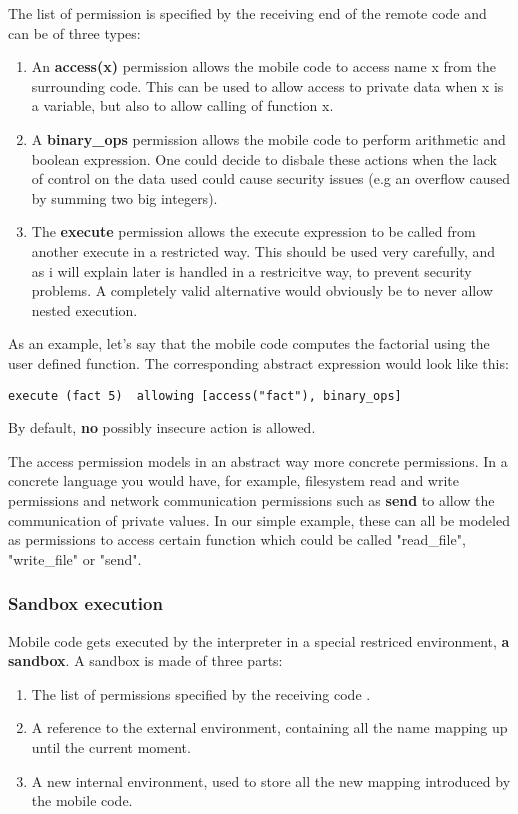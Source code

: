 \documentclass{article}
\begin{document}
The list of permission is specified by the receiving end of the remote code and can be of three types: 
\begin{enumerate}
    \item An \textbf{access(x)} permission allows the mobile code to access name x from the surrounding code. This can be used to allow access to 
    private data when x is a variable, but also to  allow calling of function x.

    \item A \textbf{binary\_ops} permission allows the mobile code to perform arithmetic and boolean expression. One could decide to disbale these actions when the lack of control on the data used 
    could cause security issues (e.g an overflow caused by summing two big integers).

    \item The \textbf{execute} permission allows the execute expression to be called from another execute in a restricted way. This should be used very carefully, and as i will explain later is handled in a restricitve way, to prevent security problems. A completely valid alternative 
    would obviously be to never allow nested execution.

\end{enumerate}
As an example, let's say that the mobile code computes the factorial using the user defined function.
The corresponding abstract expression would look like this:
\begin{lstlisting}[basicstyle=\scriptsize,keywords={execute, allowing}]
    execute (fact 5)  allowing [access("fact"), binary_ops]
\end{lstlisting}

By default, \textbf{no} possibly insecure action is allowed. 

The access permission models in an abstract way more concrete permissions. In a concrete language you would have, for example, filesystem read and write permissions and network communication permissions such as \textbf{send} to allow the 
communication of private values.
 In our simple example, these can all be modeled as permissions to access certain function which could be called "read\_file", "write\_file" or "send".

 \subsubsection{Sandbox execution}
 Mobile code gets executed by the interpreter in a special restriced environment, \textbf{a sandbox}. A sandbox is made of three parts:
 \begin{enumerate}
     \item The list of permissions specified by the receiving code .
     \item A reference to the external environment, containing all the name mapping up until the current moment.
     \item A new internal environment, used to store all the new mapping introduced by the mobile code.
 \end{enumerate}
 
\end{document}
